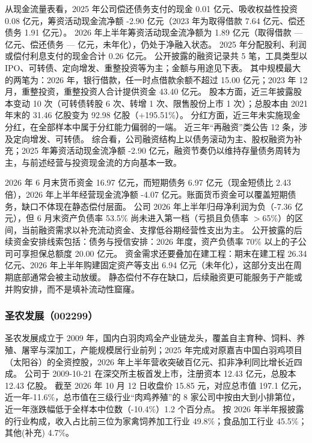  从现金流量表看，2025 年公司偿还债务支付的现金 0.01 亿元、吸收权益性投资 0.08 亿元，筹资活动现金流净额 -2.90 亿元（2023 年为取得借款 7.64 亿元、偿还债务 1.91 亿元）。 2026 年上半年筹资活动现金流净额为 1.89 亿元（取得借款 — 亿元、偿还债务 — 亿元，未年化），仍处于净融入状态。 2025 年分配股利、利润或偿付利息支付的现金合计 0.26 亿元。 公开披露的融资记录共 5 笔，工具类型以 IPO、可转债、定向增发、重整投资等为主；金额与用途见下表。 其中规模最大的两笔为：2026 年，银行借款，任一时点借款余额不超过 15.00 亿元；2023 年 12 月，重整投资，重整投资人合计提供资金 43.40 亿元。 股本方面，近三年披露股本变动 10 次（可转债转股 6 次、转增 1 次、限售股份上市 1 次）；总股本由 2021 年末的 31.46 亿股变为 92.98 亿股（+195.51\%）。 分红方面，近三年未实施现金分红，在全部样本中属于分红能力偏弱的一端。 近三年“再融资”类公告 12 条，涉及定向增发、可转债。 综合看，公司融资结构上以债务滚动为主、股权融资为补充；2025 年筹资活动现金流净额 -2.90 亿元，融资节奏仍以维持存量债务周转为主，与前述经营与投资现金流的方向基本一致。

 2026 年 6 月末货币资金 16.97 亿元，而短期债务 6.97 亿元（现金短债比 2.43 倍），2026 年上半年经营现金流净额 -4.07 亿元。账面货币资金可以覆盖短期债务，缺口不体现在静态偿付层面。 公司 2026 年上半年归母净利润为负（-7.36 亿元），但 6 月末资产负债率 53.5\% 尚未进入第一档（亏损且负债率 $>$65\%）的区间，当前融资需求以补充流动资金、支撑低谷期经营性支出为主。 公开披露的后续资金安排线索包括：债务与授信安排：2026 年度，资产负债率 70\% 以上的子公司可享担保总额度 20.00 亿元。 资金需求还要叠加在建工程：期末在建工程 26.34 亿元、2026 年上半年购建固定资产等支出 6.94 亿元（未年化），这部分支出在周期底部通常会被主动放缓。 静态偿付不存在缺口，后续融资更可能服务于产能或并购安排，而不是填补流动性窟窿。




\subsubsection{圣农发展（002299）}
\label{co:002299}

 圣农发展成立于 2009 年，国内白羽肉鸡全产业链龙头，覆盖自主育种、饲料、养殖、屠宰与深加工，产能规模居行业前列；2025 年完成对原嘉吉中国白羽鸡项目（太阳谷）的全资控股，2026 年上半年营收突破百亿元、扣非净利同比增长近四成。 公司于 2009-10-21 在深交所主板首发上市，注册资本 12.43 亿元，总股本 12.43 亿股。 截至 2026 年 10 月 12 日收盘价 15.85 元，对应总市值 197.1 亿元，近一年-11.6\%，总市值在三级行业“肉鸡养殖”的 8 家公司中按由大到小排第位，近一年涨跌幅低于全样本中位数（-10.4\%）1.2 个百分点。 按 2026 年半年报披露的行业构成，收入占比前三位为家禽饲养加工行业 49.8\%；食品加工行业 45.5\%；其他(补充) 4.7\%。

